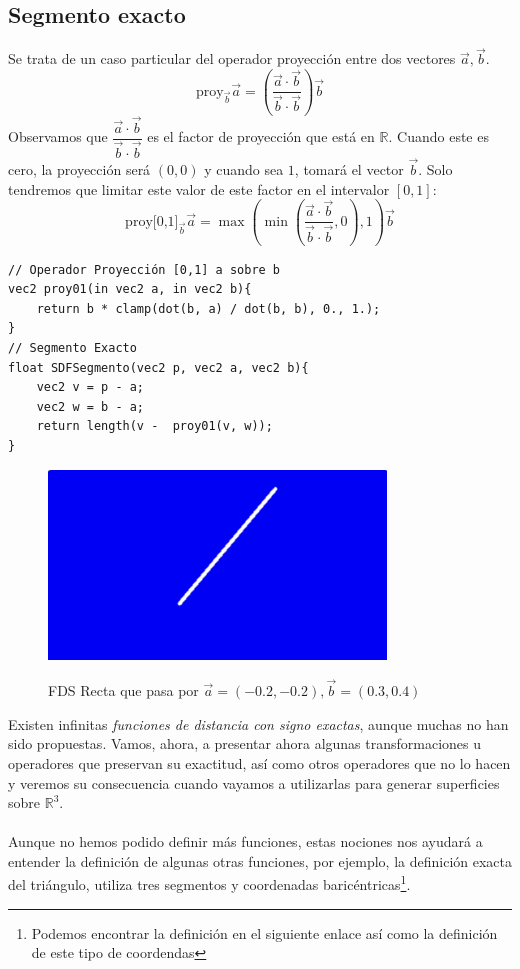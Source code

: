 \subsection{Segmento exacto}
Se trata de un caso particular del operador proyección entre dos vectores \(\Vec{a}, \Vec{b}\). 
\[ \text{proy}_{\Vec{b}}\Vec{a}=\left(\dfrac{\Vec{a}\cdot \Vec{b}}{\Vec{b}\cdot \Vec{b}}\right)\Vec{b}\]
Observamos que \(\dfrac{\Vec{a}\cdot \Vec{b}}{\Vec{b}\cdot \Vec{b}}\) es el factor de proyección que está en \(\mathbb{R}\). Cuando este es cero, la proyección será \((0,0)\) y cuando sea \(1\), tomará el vector \(\Vec{b}\). Solo tendremos que limitar este valor de este factor en el intervalor \([0,1]\):
\[ \text{proy[0,1]}_{\Vec{b}}\Vec{a}=\max\left(\min\left(\dfrac{\Vec{a}\cdot \Vec{b}}{\Vec{b}\cdot \Vec{b}}, 0\right), 1\right)\Vec{b}\]

\begin{lstlisting}
// Operador Proyección [0,1] a sobre b
vec2 proy01(in vec2 a, in vec2 b){
    return b * clamp(dot(b, a) / dot(b, b), 0., 1.);
}
// Segmento Exacto
float SDFSegmento(vec2 p, vec2 a, vec2 b){
    vec2 v = p - a;
    vec2 w = b - a;
    return length(v -  proy01(v, w));
}
\end{lstlisting}

\begin{figure}[H]
  \centering
  \captionsetup{justification=centering}%
  \includegraphics[width=0.8\textwidth]{secciones/imagenes/sdf_segmento.jpeg}\label{fig:segmento}
  \caption{FDS Recta que pasa por \(\Vec{a}=(-0.2, -0.2), \Vec{b}=(0.3, 0.4)\)}
\end{figure}

Existen infinitas \textit{funciones de distancia con signo exactas}, aunque muchas no han sido propuestas. Vamos, ahora, a presentar ahora algunas transformaciones u operadores que preservan su exactitud, así como otros operadores que no lo hacen y veremos su consecuencia cuando vayamos a utilizarlas para generar superficies sobre \(\mathbb{R}^3\).\\\\
Aunque no hemos podido definir más funciones, estas nociones nos ayudará a entender la definición de algunas otras funciones, por ejemplo, la definición exacta del triángulo, utiliza tres segmentos y coordenadas baricéntricas\footnote{Podemos encontrar la definición en el siguiente enlace así como la definición de este tipo de coordendas}.

